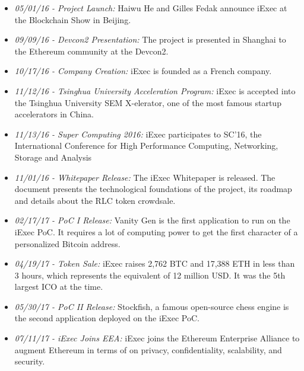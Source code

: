   \begin{itemize}
    
    \item \textit{05/01/16 - Project Launch: }
    Haiwu He and Gilles Fedak announce iExec at the Blockchain Show in Beijing.

    \item\textit{09/09/16 - Devcon2 Presentation: }
    The project is presented in Shanghai to the Ethereum community at the Devcon2.

    \item\textit{10/17/16 - Company Creation: }
    iExec is founded as a French company.

    \item\textit{11/12/16 - Tsinghua University Acceleration Program: }
    iExec is accepted into the Tsinghua University SEM X-elerator, one of the most famous startup accelerators in China.

    \item\textit{11/13/16 - Super Computing 2016: }
    iExec participates to SC’16, the International Conference for High Performance Computing, Networking, Storage and Analysis

    \item\textit{11/01/16 - Whitepaper Release: }    
    The iExec Whitepaper is released. The document presents the technological foundations of the project, its roadmap and details about the RLC token crowdsale.

    \item\textit{02/17/17 - PoC I Release: }
    Vanity Gen is the first application to run on the iExec PoC. It requires a lot of computing power to get the first character of a personalized Bitcoin address.

    \item\textit{04/19/17 - Token Sale: }
    iExec raises 2,762 BTC and 17,388 ETH in less than 3 hours, which represents the equivalent of 12 million USD. It was the 5th largest ICO at the time.


    \item\textit{05/30/17 - PoC II Release: }
    Stockfish, a famous open-source chess engine is the second application deployed on the iExec PoC.

    \item\textit{07/11/17 - iExec Joins EEA: }
    iExec joins the Ethereum Enterprise Alliance to augment Ethereum in terms of on privacy, confidentiality, scalability, and security.


\end{itemize}
